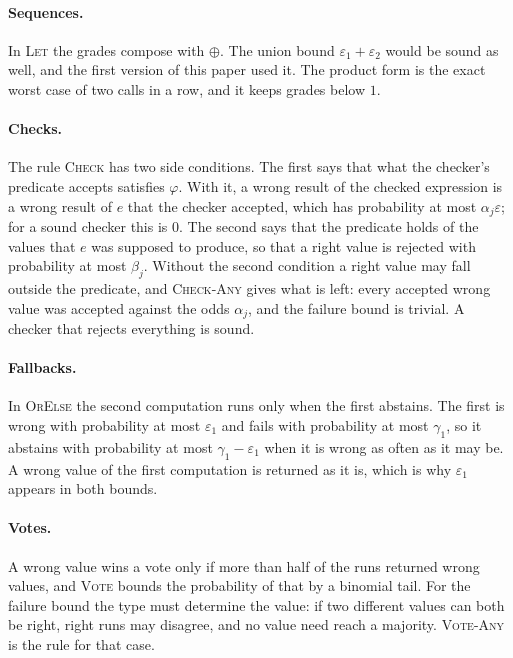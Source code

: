 \documentclass[acmsmall,nonacm,screen]{acmart}
\begin{document}
\paragraph{Sequences.} In \textsc{Let} the grades compose with $\oplus$. The union bound
$\varepsilon_1 + \varepsilon_2$ would be sound as well, and the first version of this paper
used it. The product form is the exact worst case of two calls in a row, and it keeps grades
below $1$.

\paragraph{Checks.} The rule \textsc{Check} has two side conditions. The first says that what
the checker's predicate accepts satisfies $\varphi$. With it, a wrong result of the checked
expression is a wrong result of $e$ that the checker accepted, which has probability at most
$\alpha_j \varepsilon$; for a sound checker this is $0$. The second says that the predicate
holds of the values that $e$ was supposed to produce, so that a right value is rejected with
probability at most $\beta_j$. Without the second condition a right value may fall outside
the predicate, and \textsc{Check-Any} gives what is left: every accepted wrong value was
accepted against the odds $\alpha_j$, and the failure bound is trivial. A checker that
rejects everything is sound.

\paragraph{Fallbacks.} In \textsc{OrElse} the second computation runs only when the first
abstains. The first is wrong with probability at most $\varepsilon_1$ and fails with
probability at most $\gamma_1$, so it abstains with probability at most
$\gamma_1 - \varepsilon_1$ when it is wrong as often as it may be. A wrong value of the first
computation is returned as it is, which is why $\varepsilon_1$ appears in both bounds.

\paragraph{Votes.} A wrong value wins a vote only if more than half of the runs returned
wrong values, and \textsc{Vote} bounds the probability of that by a binomial tail. For the
failure bound the type must determine the value: if two different values can both be right,
right runs may disagree, and no value need reach a majority. \textsc{Vote-Any} is the rule
for that case.
\end{document}
